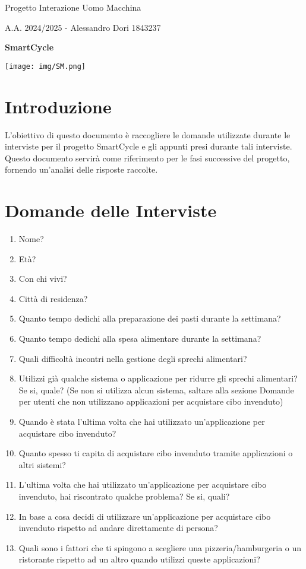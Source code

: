 \documentclass{article}
\begin{document}
\begin{center}
    \Huge Progetto Interazione Uomo Macchina
        \vspace{0.5cm}

        \large A.A. 2024/2025 - Alessandro Dori 1843237
        \vspace{1cm}

        \large \textsf{\textbf{SmartCycle}}

        \texttt{[image: img/SM.png]}
\end{center}

\tableofcontents
\newpage

\section{Introduzione}
L'obiettivo di questo documento è raccogliere le domande utilizzate durante le interviste per il progetto SmartCycle e gli appunti presi durante tali interviste.
Questo documento servirà come riferimento per le fasi successive del progetto, fornendo un'analisi delle risposte raccolte.

\section{Domande delle Interviste}
\begin{enumerate}
    \item Nome?
    \item Età?
    \item Con chi vivi?
    \item Città di residenza?
    \item Quanto tempo dedichi alla preparazione dei pasti durante la settimana?
    \item Quanto tempo dedichi alla spesa alimentare durante la settimana?
    \item Quali difficoltà incontri nella gestione degli sprechi alimentari?
    \item Utilizzi già qualche sistema o applicazione per ridurre gli sprechi alimentari? Se si, quale? (Se non si utilizza alcun sistema, saltare alla sezione Domande per utenti che non utilizzano applicazioni per acquistare cibo invenduto)
    \item Quando è stata l'ultima volta che hai utilizzato un'applicazione per acquistare cibo invenduto?
    \item Quanto spesso ti capita di acquistare cibo invenduto tramite applicazioni o altri sistemi?
    \item L'ultima volta che hai utilizzato un'applicazione per acquistare cibo invenduto, hai riscontrato qualche problema? Se si, quali?
    \item In base a cosa decidi di utilizzare un'applicazione per acquistare cibo invenduto rispetto ad andare direttamente di persona?
    \item Quali sono i fattori che ti spingono a scegliere una pizzeria/hamburgeria o un ristorante rispetto ad un altro quando utilizzi queste applicazioni?
\end{enumerate}
\end{document}
